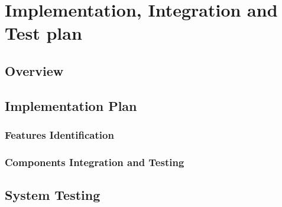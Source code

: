 \chapter{Implementation, Integration and Test plan}

\section{Overview}

\section{Implementation Plan}
\subsection{Features Identification}
\subsection{Components Integration and Testing}

\section{System Testing}
